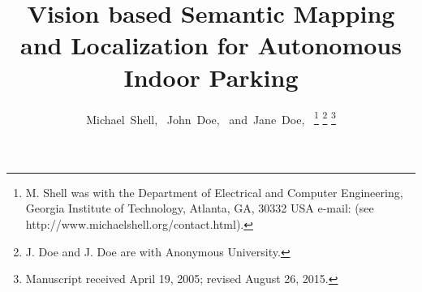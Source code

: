 \documentclass[journal]{IEEEtran}
\begin{document}
%
\title{Vision based Semantic Mapping and Localization for Autonomous Indoor Parking }
%
%
%

\author{Michael~Shell,~
        John~Doe,~
        and~Jane~Doe,~%
\thanks{M. Shell was with the Department
of Electrical and Computer Engineering, Georgia Institute of Technology, Atlanta,
GA, 30332 USA e-mail: (see http://www.michaelshell.org/contact.html).}%
\thanks{J. Doe and J. Doe are with Anonymous University.}%
\thanks{Manuscript received April 19, 2005; revised August 26, 2015.}}

% 
%
\end{document}
